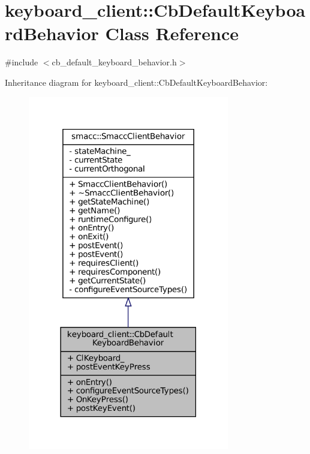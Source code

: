 \hypertarget{classkeyboard__client_1_1CbDefaultKeyboardBehavior}{}\section{keyboard\+\_\+client\+:\+:Cb\+Default\+Keyboard\+Behavior Class Reference}
\label{classkeyboard__client_1_1CbDefaultKeyboardBehavior}


{\ttfamily \#include $<$cb\+\_\+default\+\_\+keyboard\+\_\+behavior.\+h$>$}



Inheritance diagram for keyboard\+\_\+client\+:\+:Cb\+Default\+Keyboard\+Behavior\+:
\nopagebreak
\begin{figure}[H]
\begin{center}
\leavevmode
\includegraphics[width=249pt]{classkeyboard__client_1_1CbDefaultKeyboardBehavior__inherit__graph}
\end{center}
\end{figure}


